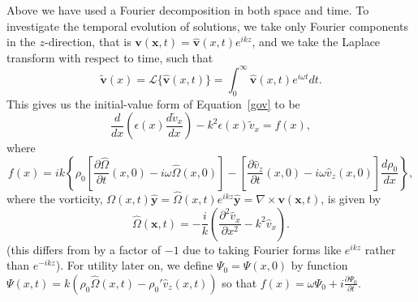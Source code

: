 \documentclass{aastex61}
\begin{document}
Above we have used a Fourier decomposition in both space and time. To investigate the temporal evolution of solutions, we take only Fourier components in the $z$-direction, that is $\mathbf{v}(\mathbf{x},t) = \mathbf{\hat{v}}(x,t)e^{ikz}$, and we take the Laplace transform with respect to time, such that
\begin{equation}
\mathbf{\tilde{v}}(x) = \mathcal{L}\{\mathbf{\hat{v}}(x, t)\} = \int_0^\infty \mathbf{\widehat{v}}(x,t)e^{i\omega t} dt.
\end{equation}
This gives us the initial-value form of Equation~\eqref{gov} to be
\begin{equation}
\frac{d}{dx}\left(\epsilon(x) \frac{d\tilde{v}_x}{dx}\right) - k^2\epsilon(x)\tilde{v}_x = f(x),
\label{ivp gov}
\end{equation}
where
\begin{equation}
f(x) = ik\left\{\rho_0\left[\frac{\partial\hat{\Omega}}{\partial t}(x,0) - i\omega\hat{\Omega}(x,0)\right] - \left[\frac{\partial\hat{v}_z}{\partial t}(x,0) - i\omega \hat{v}_z(x,0)\right]\frac{d\rho_0}{dx}\right\},
\label{f}
\end{equation}
where the vorticity, $\Omega(x,t)\mathbf{\hat{y}} = \hat{\Omega}(x,t)e^{ikz}\mathbf{\hat{y}} = \nabla \times \mathbf{v}(\mathbf{x},t)$, is given by
\begin{equation}
\hat{\Omega}(\mathbf{x},t) = -\frac{i}{k}\left(\frac{\partial^2\hat{v}_x}{\partial x^2} - k^2 \hat{v}_x\right).
\end{equation}
(this differs from \cite{rae_etal81} by a factor of $-1$ due to taking Fourier forms like $e^{ikz}$ rather than $e^{-ikz}$). For utility later on, we define $\Psi_0 = \Psi(x, 0)$ by function $\Psi(x, t) = k(\rho_0\hat{\Omega}(x, t) - \rho_0'\hat{v}_z(x, t))$ so that $f(x) = \omega \Psi_0 + i\frac{\partial \Psi_0}{\partial t}$.
\end{document}
